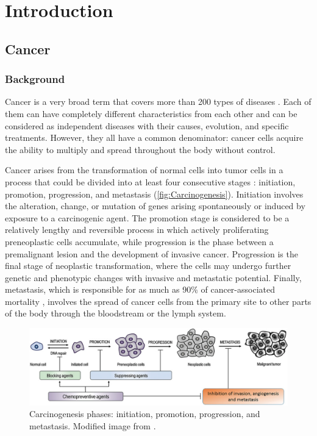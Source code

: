\chapter{Introduction}

\section{Cancer}

\subsection{Background}

Cancer is a very broad term that covers more than 200 types of diseases \cite{WCR}. Each of them can have completely different characteristics from each other and can be considered as independent diseases with their causes, evolution, and specific treatments. However, they all have a common denominator: cancer cells acquire the ability to multiply and spread throughout the body without control.

Cancer arises from the transformation of normal cells into tumor cells in a process that could be divided into at least four consecutive stages \cite{Stages}: initiation, promotion, progression, and metastasis (\autoref{fig:Carcinogenesis}). Initiation involves the alteration, change, or mutation of genes arising spontaneously or induced by exposure to a carcinogenic agent. The promotion stage is considered to be a relatively lengthy and reversible process in which actively proliferating preneoplastic cells accumulate, while progression is the phase between a premalignant lesion and the development of invasive cancer. Progression is the final stage of neoplastic transformation, where the cells may undergo further genetic and phenotypic changes with invasive and metastatic potential. Finally, metastasis, which is responsible for as much as 90\% of cancer-associated mortality \cite{Metastasis}, involves the spread of cancer cells from the primary site to other parts of the body through the bloodstream or the lymph system.

\begin{figure}[t]
    \centering
    \includegraphics[width=\textwidth]{Images/chapter_1/carcinogenesis.png}
    \caption{Carcinogenesis phases: initiation, promotion, progression, and metastasis. Modified image from \cite{Stages}.}
    \label{fig:Carcinogenesis}
\end{figure}

